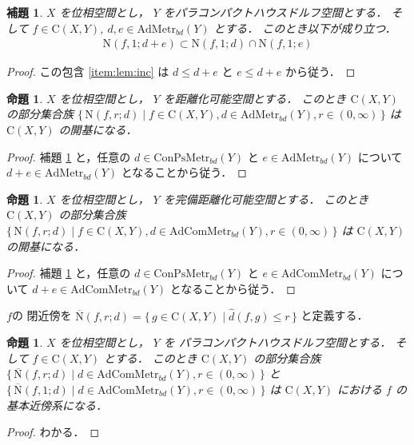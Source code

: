 \documentclass[leqno, a4paper, 12pt]{jsarticle}
\numberwithin{equation}{section}
\newtheorem{prop}[thm]{命題}
\newtheorem{lem}[thm]{補題}
\newcommand{\yomapl}[2]{\mathrm{C}(#1, #2)}
\newcommand{\yonbsetq}[3]{\mathrm{N}(#1, #2; #3)}
\newcommand{\yonbsetqc}[3]{\overline{\mathrm{N}}(#1, #2; #3)}
\newcommand{\yosupmet}[1]{\hat{#1}}
\newcommand{\yocbmet}[1]{\mathrm{ConPsMetr}_{bd}(#1)}
\newcommand{\yocbamet}[1]{\mathrm{AdMetr}_{bd}(#1)}
\newcommand{\yocbacmet}[1]{\mathrm{AdComMetr}_{bd}(#1)}
\begin{document}
\begin{lem}\label{lem:inc}
$X$
を位相空間とし，
$Y$
をパラコンパクトハウスドルフ空間とする．
そして
$f\in \yomapl{X}{Y}$, 
$d, e\in \yocbamet{Y}$
とする．
このとき以下が成り立つ．
\begin{align}\label{item:lem:inc}
\yonbsetq{f}{1}{d+e}\subset \yonbsetq{f}{1}{d}\cap \yonbsetq{f}{1}{e}
\end{align}
\end{lem}
\begin{proof}
この包含
\eqref{item:lem:inc}
は
$d\le d+e$
と
$e\le d+e$
から従う．
\end{proof}


\begin{prop}\label{prop:basis3}
$X$
を位相空間とし，
$Y$
を距離化可能空間とする．
このとき
$\yomapl{X}{Y}$
の部分集合族
$\{\, \yonbsetq{f}{r}{d}\mid f\in \yomapl{X}{Y}, 
d\in \yocbamet{Y}, r\in (0, \infty)\, \}$
は
$\yomapl{X}{Y}$
の開基になる．
\end{prop}
\begin{proof}
補題
\ref{lem:inc}
と，任意の
$d\in \yocbmet{Y}$
と
$e\in \yocbamet{Y}$
について
$d+e\in \yocbamet{Y}$
となることから従う．
\end{proof}



\begin{prop}\label{prop:basis4}
$X$
を位相空間とし，
$Y$
を完備距離化可能空間とする．
このとき
$\yomapl{X}{Y}$
の部分集合族
$\{\, \yonbsetq{f}{r}{d}\mid f\in \yomapl{X}{Y}, 
d\in \yocbacmet{Y}, r\in (0, \infty)\, \}$
は
$\yomapl{X}{Y}$
の開基になる．
\end{prop}
\begin{proof}
補題
\ref{lem:inc}
と，任意の
$d\in \yocbmet{Y}$
と
$e\in \yocbacmet{Y}$
について
$d+e\in \yocbacmet{Y}$
となることから従う．
\end{proof}


$f$の
閉近傍を
$\yonbsetqc{f}{r}{d}=\{\, g\in \yomapl{X}{Y}\mid 
\yosupmet{d}(f, g)\le r\, \}$
と定義する．
\begin{prop}\label{prop:nbbasis}
$X$
を位相空間とし，
$Y$
を
パラコンパクトハウスドルフ空間とする．
そして
$f\in \yomapl{X}{Y}$
とする．
このとき
$\yomapl{X}{Y}$
の部分集合族
$\{\, \yonbsetqc{f}{r}{d}\mid
d\in \yocbacmet{Y}, r\in (0, \infty)\, \}$
と
$\{\, \yonbsetqc{f}{1}{d}\mid 
d\in \yocbacmet{Y}, r\in (0, \infty)\, \}$
は
$\yomapl{X}{Y}$
における
$f$
の基本近傍系になる．
\end{prop}
\begin{proof}
わかる．
\end{proof}
\end{document}
